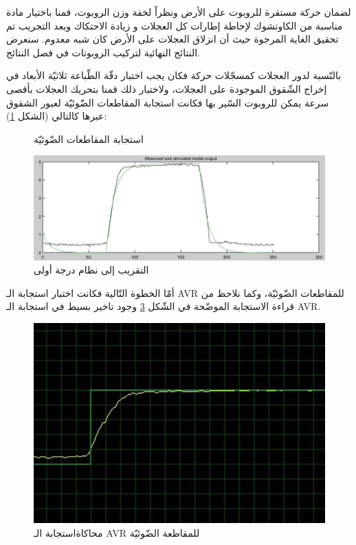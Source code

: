 لضمان حركة مستقرة للروبوت على الأرض ونظراً لخفة وزن الروبوت، قمنا باختيار مادة مناسبة من الكاوتشوك لإحاطة إطارات كل العجلات و زيادة الاحتكاك وبعد التجريب تم تحقيق الغاية المرجوة حيث أن انزلاق العجلات على الأرض كان شبه معدوم. سنعرض النتائج النهائية لتركيب الروبوتات في فصل النتائج.

بالنّسبة لدور العجلات كمسجّلات حركة فكان يجب اختبار دقّة الطّباعة ثلاثيّة الأبعاد في إخراج الشّقوق الموجودة على العجلات، ولاختبار ذلك قمنا بتحريك العجلات بأقصى سرعة يمكن للروبوت السّير بها فكانت استجابة المقاطعات الضّوئيّة لعبور الشقوق عبرها كالتالي (الشكل \ref{15:fig:enc}): 


 \begin{figure}[htbp]
	\centering
	
	\caption{استجابة المقاطعات الضّوئيّة}
	\label{15:fig:enc}
\end{figure}

\begin{figure}
	\centering
	\includegraphics[width=0.9\linewidth]{figs/15/fig15_enc2}
	\caption{التقريب إلى نظام درجة أولى}
	\label{fig:fig15enc2}
\end{figure}

أمّا الخطوة التّالية فكانت اختبار استجابة الـ AVR للمقاطعات الضّوئيّة، وكما نلاحظ من قراءة الاستجابة الموضّحة في الشّكل \ref{fig:fig15enc3} وجود تاخير بسيط في استجابة الـ AVR.

\begin{figure}
	\centering
	\includegraphics[width=0.7\linewidth]{figs/15/fig15_enc3}
	\caption{محاكاةاستجابة الـ AVR للمقاطعة الضّوئيّة}
	\label{fig:fig15enc3}
\end{figure}

